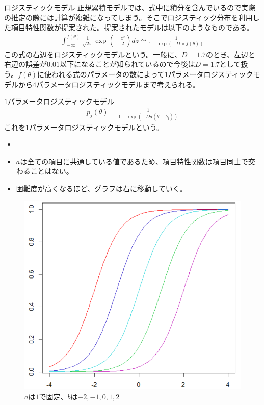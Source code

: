\documentclass[aspectratio=169, dvipdfmx, 12pt]{beamer}
\begin{document}
\begin{frame}
  \begin{block}{ロジスティックモデル}
    正規累積モデルでは、式中に積分を含んでいるので実際の推定の際には計算が複雑になってしまう。そこでロジスティック分布を利用した項目特性関数が提案された。提案されたモデルは以下のようなものである。
    \begin{align}
      \displaystyle
      \int_{-\infty}^{f(\theta)} \frac{1}{\sqrt{2\pi}} \exp(-\frac{z^2}{2})dz \simeq \frac{1}{1 + \exp(-D \times f(\theta))}
    \end{align}この式の右辺をロジスティックモデルという。一般に、$D = 1.7$のとき、左辺と右辺の誤差が$0.01$以下になることが知られているので今後は$D = 1.7$として扱う。$f(\theta)$に使われる式のパラメータの数によって$1$パラメータロジスティックモデルから$4$パラメータロジスティックモデルまで考えられる。
  \end{block}
\end{frame}
\begin{frame}
    \begin{block}{$1$パラメータロジスティックモデル}
    \begin{align}
      \displaystyle p_j(\theta) = \frac{1}{1+\exp(-Da(\theta - b_j))}
    \end{align}
    これを$1$パラメータロジスティックモデルという。
    \begin{itemize}
      \item[]
      \item $a$は全ての項目に共通している値であるため、項目特性関数は項目同士で交わることはない。
      \item 困難度が高くなるほど、グラフは右に移動していく。
    \end{itemize}
  \end{block}
\end{frame}
\begin{frame}
    \begin{figure}[H]
      \centering
      \includegraphics[bb = 500 450 1 1,scale = 0.25]{B.png}
      \vspace{4cm}
      \caption{$a$は$1$で固定、$b$は$-2, -1, 0, 1, 2$}
    \end{figure}
\end{frame}
\end{document}
